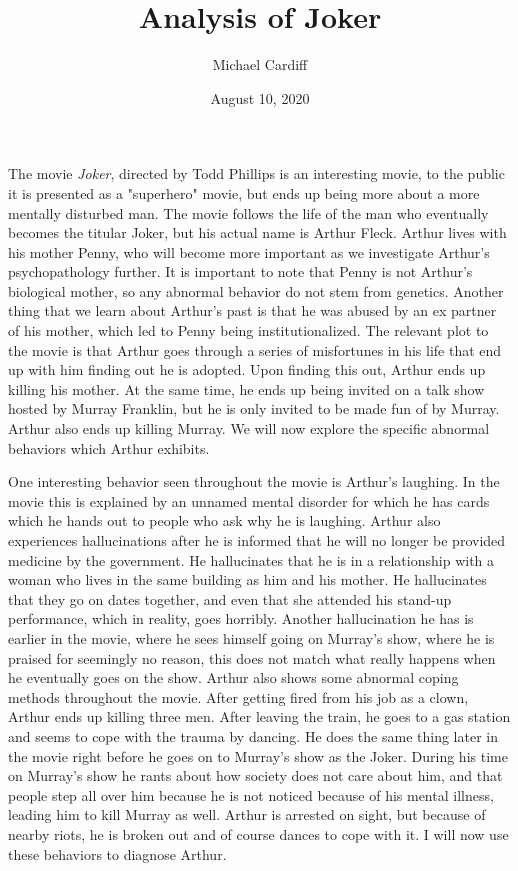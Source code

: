 \documentclass[12pt]{article}
\title{Analysis of Joker}
\author{Michael Cardiff}
\date{August 10, 2020}
\begin{document}
\maketitle
The movie \textit{Joker}, directed by Todd Phillips is an interesting movie, to the public it is presented as a "superhero" movie, but ends up being more about a more mentally disturbed man. The movie follows the life of the man who eventually becomes the titular Joker, but his actual name is Arthur Fleck. Arthur lives with his mother Penny, who will become more important as we investigate Arthur's psychopathology further. It is important to note that Penny is not Arthur's biological mother, so any abnormal behavior do not stem from genetics. Another thing that we learn about Arthur's past is that he was abused by an ex partner of his mother, which led to Penny being institutionalized. The relevant plot to the movie is that Arthur goes through a series of misfortunes in his life that end up with him finding out he is adopted. Upon finding this out, Arthur ends up killing his mother. At the same time, he ends up being invited on a talk show hosted by Murray Franklin, but he is only invited to be made fun of by Murray. Arthur also ends up killing Murray. We will now explore the specific abnormal behaviors which Arthur exhibits.
\par
One interesting behavior seen throughout the movie is Arthur's laughing. In the movie this is explained by an unnamed mental disorder for which he has cards which he hands out to people who ask why he is laughing. Arthur also experiences hallucinations after he is informed that he will no longer be provided medicine by the government. He hallucinates that he is in a relationship with a woman who lives in the same building as him and his mother. He hallucinates that they go on dates together, and even that she attended his stand-up performance, which in reality, goes horribly. Another hallucination he has is earlier in the movie, where he sees himself going on Murray's show, where he is praised for seemingly no reason, this does not match what really happens when he eventually goes on the show. Arthur also shows some abnormal coping methods throughout the movie. After getting fired from his job as a clown, Arthur ends up killing three men. After leaving the train, he goes to a gas station and seems to cope with the trauma by dancing. He does the same thing later in the movie right before he goes on to Murray's show as the Joker. During his time on Murray's show he rants about how society does not care about him, and that people step all over him because he is not noticed because of his mental illness, leading him to kill Murray as well. Arthur is arrested on sight, but because of nearby riots, he is broken out and of course dances to cope with it. I will now use these behaviors to diagnose Arthur.
\end{document}
